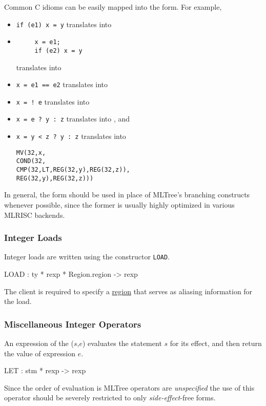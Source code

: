 Common C idioms can be easily mapped into the  form. For example,
\begin{itemize}
  \item \verb|if (e1) x = y| translates into
  \item
   \begin{verbatim}
     x = e1; 
     if (e2) x = y
   \end{verbatim}
    translates into 
  \item \verb|x = e1 == e2| translates into
  \item \verb|x = ! e| translates into
  \item \verb|x = e ? y : z| translates into
   , and
  \item \verb|x = y < z ? y : z| translates into
   \begin{alltt}
     MV(32,x,
         COND(32,
            CMP(32,LT,REG(32,y),REG(32,z)),
               REG(32,y),REG(32,z)))
   \end{alltt} 
\end{itemize}

In general, the  form should be used in place of MLTree's branching
constructs whenever possible, since the former is usually highly 
optimized in various MLRISC backends. 

\subsubsection{Integer Loads}

Integer loads are written using the constructor \verb|LOAD|.
\begin{SML}
   LOAD  : ty * rexp * Region.region -> rexp
\end{SML}
The client is required to specify a \href{regions.html}{region} that
serves as aliasing information for the load.  

\subsubsection{Miscellaneous Integer Operators}

An expression of the ($s$,$e$) evaluates the statement $s$ for
its effect, and then return the value of expression $e$.
\begin{SML}
  LET  : stm * rexp -> rexp
\end{SML}
Since the order of evaluation is MLTree operators are 
\emph{unspecified}
the use of this operator should be severely restricted to only 
\emph{side-effect}-free forms.

